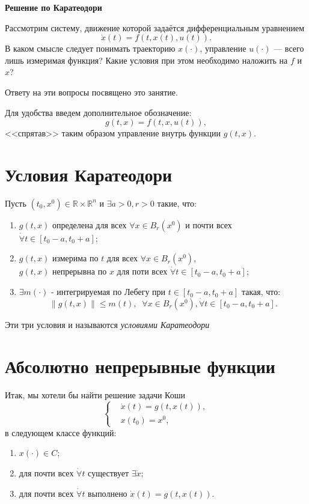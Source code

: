 \documentclass[12pt, a4paper]{article}
\theoremstyle{rusdef}
\newcommand{\R}{\ensuremath{\mathbb{R}}} %
\newcommand{\norm}[1]{\left\lVert #1 \right\rVert} %
\begin{document}
\begin{center}
{\Huge \textbf{Решение по Каратеодори}}
\end{center}

Рассмотрим систему, движение которой задаётся дифференциальным уравнением
$$
\dot{x}(t) = f(t, x(t), u(t)).
$$
В каком смысле следует понимать траекторию $x(\cdot)$, управление $u(\cdot)$ --- всего лишь измеримая функция? Какие условия при этом необходимо наложить на $f$ и $x$?

Ответу на эти вопросы посвящено это занятие.

Для удобства введем дополнительное обозначение:
$$
g(t,x) = f(t,x,u(t)),
$$
<<спрятав>> таким образом управление внутрь функции $g(t,x)$.

\section*{Условия Каратеодори}
Пусть $(t_0, x^0) \in \R \times \R^n$ и $\exists a>0, r>0$ такие, что:
\begin{enumerate}
\item $g(t,x)$ определена для всех $\forall x \in B_r(x^0)$ и почти всех $\dot{\forall} t \in [t_0 - a, t_0 + a]$;
\item $g(t,x)$ измерима по $t$ для всех $\forall x \in B_r(x^0)$, \\
      $g(t,x)$ непрерывна по $x$ для поти всех $\dot{\forall} t \in [t_0 - a, t_0 + a]$;
\item $\exists m(\cdot)$ - интегрируемая по Лебегу при $t \in [t_0 - a, t_0 + a]$ такая, что:
$$
\norm{g(t,x)} \leqslant m(t), \;\; \forall x \in B_r(x^0), \dot{\forall} t \in [t_0 - a, t_0 + a].
$$
\end{enumerate}
Эти три условия и называются \textit{условиями Каратеодори}

\section*{Абсолютно непрерывные функции}
Итак, мы хотели бы найти решение задачи Коши
\begin{equation}\label{eq:system dotx equal g(t,x(t))}
\left\{
\begin{aligned}
& \dot{x}(t) = g(t, x(t)),\\
& x(t_0) = x^0,
\end{aligned}
\right.
\end{equation}
в следующем классе функций:
\begin{enumerate}
\item $x(\cdot) \in C$;
\item для почти всех $\dot{\forall} t$ существует $\exists \dot{x}$;
\item для почти всех $\dot{\forall} t$ выполнено $\dot{x}(t) = g(t,x(t))$.
\end{enumerate}
\end{document}
